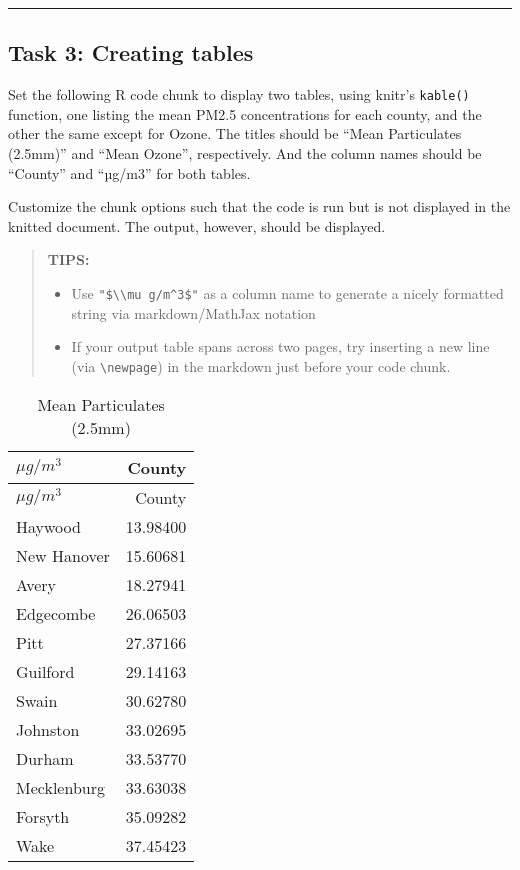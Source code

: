 \documentclass[
]{article}
\begin{document}
\begin{center}\rule{0.5\linewidth}{0.5pt}\end{center}

\hypertarget{task-3-creating-tables}{%
\subsection{Task 3: Creating tables}\label{task-3-creating-tables}}

Set the following R code chunk to display two tables, using knitr's
\texttt{kable()} function, one listing the mean PM2.5 concentrations for
each county, and the other the same except for Ozone. The titles should
be ``Mean Particulates (2.5mm)'' and ``Mean Ozone'', respectively. And
the column names should be ``County'' and ``µg/m3'' for both tables.

Customize the chunk options such that the code is run but is not
displayed in the knitted document. The output, however, should be
displayed.

\begin{quote}
\textbf{TIPS:}

\begin{itemize}
\item
  Use \texttt{"\$\textbackslash{}\textbackslash{}mu\ g/m\^{}3\$"} as a
  column name to generate a nicely formatted string via markdown/MathJax
  notation
\item
  If your output table spans across two pages, try inserting a new line
  (via \texttt{\textbackslash{}newpage}) in the markdown just before
  your code chunk.
\end{itemize}
\end{quote}

\newpage

\begin{longtable}[]{@{}lr@{}}
\caption{Mean Particulates (2.5mm)}\tabularnewline
\toprule()
\(\mu g/m^3\) & County \\
\midrule()
\endfirsthead
\toprule()
\(\mu g/m^3\) & County \\
\midrule()
\endhead
Haywood & 13.98400 \\
New Hanover & 15.60681 \\
Avery & 18.27941 \\
Edgecombe & 26.06503 \\
Pitt & 27.37166 \\
Guilford & 29.14163 \\
Swain & 30.62780 \\
Johnston & 33.02695 \\
Durham & 33.53770 \\
Mecklenburg & 33.63038 \\
Forsyth & 35.09282 \\
Wake & 37.45423 \\
\bottomrule()
\end{longtable}
\end{document}
